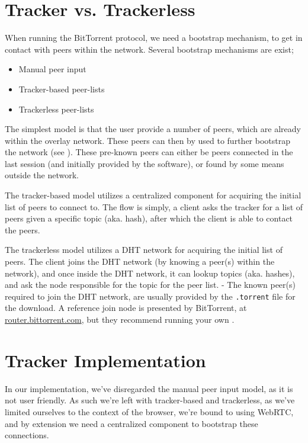 \section{Tracker vs. Trackerless}
\label{sec:trackerless}
When running the BitTorrent protocol, we need a bootstrap mechanism, to get in
contact with peers within the network. Several bootstrap mechanisms are exist;
\begin{itemize}
\item Manual peer input
\item Tracker-based peer-lists
\item Trackerless peer-lists
\end{itemize}
The simplest model is that the user provide a number of peers, which are
already within the overlay network. These peers can then by used to further
bootstrap the network (see \citep{bittorrent:bep11}). These pre-known peers
can either be peers connected in the last session (and initially provided by
the software), or found by some means outside the network.

The tracker-based model utilizes a centralized component for acquiring the
initial list of peers to connect to. The flow is simply, a client asks the
tracker for a list of peers given a specific topic (aka. hash), after which the
client is able to contact the peers.

The trackerless model utilizes a \acs{DHT} network for acquiring the initial list of 
peers. The client joins the \acs{DHT} network (by knowing a peer(s) within the network),
and once inside the \acs{DHT} network, it can lookup topics (aka. hashes), and ask
the node responsible for the topic for the peer list.
\newline
- The known peer(s) required to join the \acs{DHT} network, are usually provided by
the \verb|.torrent| file for the download. A reference join node is presented
by BitTorrent, at \url{router.bittorrent.com}, but they recommend running your
own \citep{bittorrent:bep05}.

\section{Tracker Implementation}
In our implementation, we've disregarded the manual peer input model, as it is
not user friendly. As such we're left with tracker-based and trackerless, as 
we've limited ourselves to the context of the browser, we're bound to using 
WebRTC, and by extension we need a centralized component to bootstrap these
connections. 

